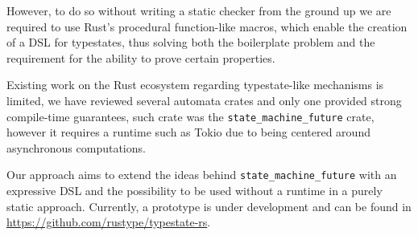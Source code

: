 \documentclass[a4paper, 10pt]{article}
\begin{document}
However, to do so without writing a static checker from the ground up we are required to use Rust's procedural function-like macros,
which enable the creation of a DSL for typestates,
thus solving both the boilerplate problem and the requirement for the ability to prove certain properties.

Existing work on the Rust ecosystem regarding typestate-like mechanisms is limited,
we have reviewed several automata crates and only one provided strong compile-time guarantees,
such crate was the \texttt{state\_machine\_future} crate,
however it requires a runtime such as Tokio due to being centered around asynchronous computations.

Our approach aims to extend the ideas behind \texttt{state\_machine\_future} with an expressive DSL and
the possibility to be used without a runtime in a purely static approach.
Currently, a prototype is under development and can be found in \url{https://github.com/rustype/typestate-rs}.

\end{document}
